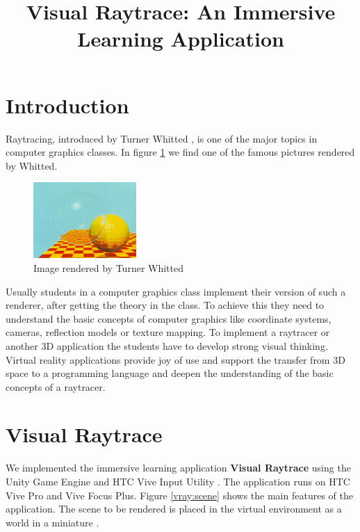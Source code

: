 \documentclass{VRARWorkshop}
\title{Visual Raytrace: An Immersive Learning Application}
\begin{document}

\section{Introduction}
Raytracing, introduced by Turner Whitted \cite{whitted_80}, is one of the major topics in
computer graphics classes.
In figure \ref{intro:whitted} we find one of the famous pictures rendered by Whitted.

\begin{figure}[h!]
    \begin{center}
        \includegraphics[width=0.35\textwidth]{whitted02.jpg}
        \caption{\label{intro:whitted} Image rendered by Turner Whitted \cite{checkerSpheres}}
    \end{center}
\end{figure}
Usually students in a computer graphics class implement their version of such a renderer,
after getting the theory in the class.
To achieve this they need to understand the basic concepts of computer graphics like coordinate systems,
cameras, reflection models or texture mapping. To implement a raytracer or another 3D application the students have to
develop strong visual thinking. Virtual reality applications provide joy of use and support the transfer
from 3D space to a programming language and deepen the understanding of the basic concepts of a raytracer.
%
\section{Visual Raytrace}
We implemented the immersive learning application \textbf{Visual Raytrace} \cite{saerota_21, visualraytrace} using the Unity Game Engine
and HTC Vive Input Utility \cite{viveInput}.
The application runs on HTC Vive Pro and Vive Focus Plus.
Figure \ref{vray:scene} shows the main features of the application.
The scene to be rendered is placed in the virtual environment as a world in a miniature \cite{pausch_95}.
\end{document}
